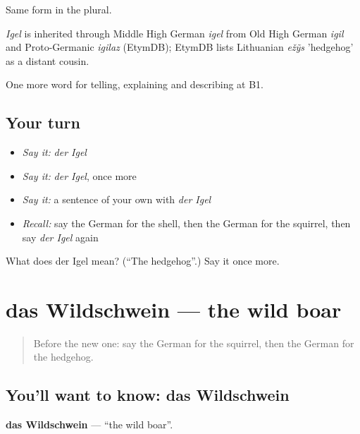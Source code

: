 Same form in the plural.

\begin{cousinweb}
\emph{Igel} is inherited through Middle High German \emph{igel} from Old High German \emph{igil} and Proto-Germanic \emph{igilaz} (EtymDB); EtymDB lists Lithuanian \emph{ežỹs} 'hedgehog' as a distant cousin.
\end{cousinweb}

\begin{grammarlens}[title={What you've built}]
One more word for telling, explaining and describing at B1.
\end{grammarlens}

\subsection*{Your turn}
\begin{itemize}
\raggedright
  \item \emph{Say it:} \emph{der Igel}
  \item \emph{Say it:} \emph{der Igel}, once more
  \item \emph{Say it:} a sentence of your own with \emph{der Igel}
  \item \emph{Recall:} say the German for the shell, then the German for the squirrel, then say \emph{der Igel} again
\end{itemize}

\begin{tcolorbox}[breakable,colback=teal!4,colframe=teal!35!black,title={Before you move on}]
What does der Igel mean? (\textquotedblleft{}The hedgehog\textquotedblright{}.) Say it once more.
\end{tcolorbox}
\section[das Wildschwein]{das Wildschwein — the wild boar}

\label{lesson:GE-C458-wildschwein}



\begin{quote}
Before the new one: say the German for the squirrel, then the German for the hedgehog.
\end{quote}

\subsection*{You'll want to know: das Wildschwein}
\textbf{das Wildschwein} — \textquotedblleft{}the wild boar\textquotedblright{}.

